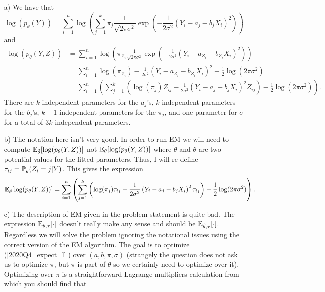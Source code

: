 \begin{enumerate}
\item[a)] 
We have that 
\[
\log(p_{\theta}(Y)) = \sum_{i=1}^n \log\left(\sum_{j=1}^k \pi_j \frac{1}{\sqrt{2\pi\sigma^2}} \exp\left(-\frac{1}{2\sigma^2} \left(Y_i - a_j - b_jX_i\right)^2 \right) \right)
\]
and 
\begin{align*}
\log(p_{\theta}(Y,Z)) & = \sum_{i=1}^n \log\left( \pi_{Z_i} \frac{1}{\sqrt{2\pi\sigma^2}} \exp\left(-\frac{1}{2\sigma^2} \left(Y_i - a_{Z_i} - b_{Z_i}X_i\right)^2 \right) \right)\\
& = \sum_{i=1}^n \log(\pi_{Z_i}) - \frac{1}{2\sigma^2}  \left(Y_i - a_{Z_i} - b_{Z_i}X_i\right)^2 - \frac{1}{2}\log(2\pi\sigma^2)\\
& = \sum_{i=1}^n \left( \sum_{j=1}^k \left( \log(\pi_{j}) Z_{ij} - \frac{1}{2\sigma^2}  \left(Y_i - a_{j} - b_{j}X_i\right)^2 Z_{ij} \right)- \frac{1}{2}\log(2\pi\sigma^2) \right).
\end{align*}
There are $k$ independent parameters for the $a_j$'s, $k$ independent parameters for the $b_j$'s, $k-1$ independent parameters for the $\pi_j$, and one parameter for $\sigma$ for a total of $3k$ independent parameters.
\item[b)]
The notation here isn't very good. In order to run EM we will need to compute $\mathbb{E}_{\tilde{\theta}}[\log(p_{\theta}(Y,Z))]$ not $\mathbb{E}_{\theta}[\log(p_{\theta}(Y,Z))]$ where $\tilde{\theta}$ and $\theta$ are two potential values for the fitted parameters. Thus, I will re-define $\tau_{ij} = \mathbb{P}_{\tilde{\theta}}(Z_i = j|Y)$. This gives the expression
\begin{equation}\label{2020Q4_expect_ll}
\mathbb{E}_{\tilde{\theta}}[\log(p_{\theta}(Y,Z))] = \sum_{i=1}^n \left( \sum_{j=1}^k \left( \log(\pi_{j})\tau_{ij} - \frac{1}{2\sigma^2}  \left(Y_i - a_{j} - b_{j}X_i\right)^2 \tau_{ij}  \right) - \frac{1}{2}\log(2\pi\sigma^2) \right).
\end{equation}
\item[c)]
The description of EM given in the problem statement is quite bad. The expression $\mathbb{E}_{\theta,\tau}[\cdot]$ doesn't really make any sense and should be $\mathbb{E}_{\hat{\theta},\tau}[\cdot]$. Regardless we will solve the problem ignoring the notational issues using the correct version of the EM algorithm. The goal is to optimize (\ref{2020Q4_expect_ll}) over $(a,b,\pi,\sigma)$ (strangely the question does not ask us to optimize $\pi$, but $\pi$ is part of $\theta$ so we certainly need to optimize over it). Optimizing over $\pi$ is a straightforward Lagrange multipliers calculation from which you should find that 

\end{enumerate}
